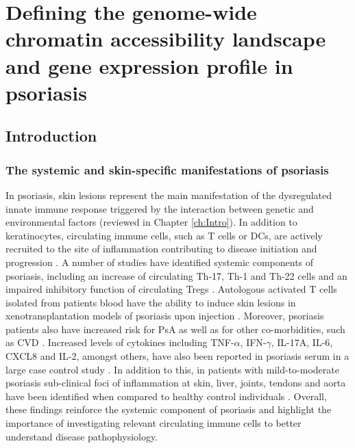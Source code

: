\chapter{Defining the genome-wide chromatin accessibility landscape and gene expression profile in psoriasis}
\label{ch:Results2}


\section{Introduction}

\subsection{The systemic and skin-specific manifestations of psoriasis}

In psoriasis, skin lesions represent the main manifestation of the dysregulated innate immune response triggered by the interaction between genetic and environmental factors (reviewed in Chapter \ref{ch:Intro}). In addition to keratinocytes, circulating immune cells, such as T cells or DCs, are actively recruited to the site of inflammation contributing to disease initiation and progression \parencite{Johnson-Huang2009}. A number of studies have identified systemic components of psoriasis, including an increase of circulating Th-17, Th-1 and Th-22 cells and an impaired inhibitory function of circulating Tregs \parencite{Kagami2010,Sugiyama2005}. Autologous activated T cells isolated from patients blood have the ability to induce skin lesions in xenotransplantation models of psoriasis upon injection \parencite{Wrone-Smith1996,Nickoloff1999}. Moreover, psoriasis patients also have increased risk for PsA as well as for other co-morbidities, such as CVD \parencite{Ibrahim2009,Shapiro2007}. Increased levels of cytokines including TNF-$\alpha$, IFN-$\gamma$, IL-17A, IL-6, CXCL8 and IL-2, amongst others, have also been reported in psoriasis serum in a large case control study \parencite{Sahmatova2017,Bai2018}. In addition to this, in patients with mild-to-moderate psoriasis sub-clinical foci of inflammation at skin, liver, joints, tendons and aorta have been identified when compared to healthy control individuals \parencite{Mehta2011}. Overall, these findings reinforce the systemic component of psoriasis and highlight the importance of investigating relevant circulating immune cells to better understand disease pathophysiology.

